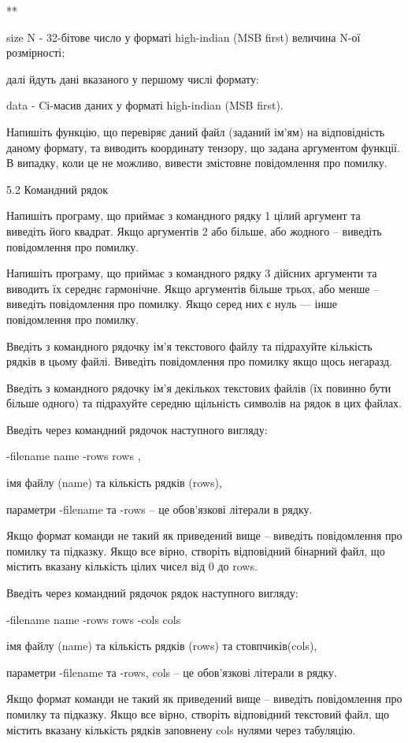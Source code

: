 \documentclass[]{article}
\begin{document}
**

size N - 32-бітове число у форматі high-indian (MSB first) величина N-ої
розмірності;

далі йдуть дані вказаного у першому числі формату:

data - Cі-масив даних у форматі high-indian (MSB first).

Напишіть функцію, що перевіряє даний файл (заданий ім'ям) на
відповідність даному формату, та виводить координату тензору, що задана
аргументом функції. В випадку, коли це не можливо, вивести змістовне
повідомлення про помилку.

5.2 Командний рядок

Напишіть програму, що приймає з командного рядку 1 цілий аргумент та
виведіть його квадрат. Якщо аргументів 2 або більше, або жодного --
виведіть повідомлення про помилку.

Напишіть програму, що приймає з командного рядку 3 дійсних аргументи та
виводить їх середнє гармонічне. Якщо аргументів більше трьох, або менше
-- виведіть повідомлення про помилку. Якщо серед них є нуль --- інше
повідомлення про помилку.

Введіть з командного рядочку ім'я текстового файлу та підрахуйте
кількість рядків в цьому файлі. Виведіть повідомлення про помилку якщо
щось негаразд.

Введіть з командного рядочку ім'я декількох текстових файлів (їх повинно
бути більше одного) та підрахуйте середню щільність символів на рядок в
цих файлах.

Введіть через командний рядочок наступного вигляду:

-filename name -rows rows ,

імя файлу (name) та кількість рядків (rows),

параметри -filename та -rows -- це обов'язкові літерали в рядку.

Якщо формат команди не такий як приведений вище -- виведіть повідомлення
про помилку та підказку. Якщо все вірно, створіть відповідний бінарний
файл, що містить вказану кількість цілих чисел від 0 до rows.

Введіть через командний рядочок рядок наступного вигляду:

-filename name -rows rows -cols cols

імя файлу (name) та кількість рядків (rows) та стовпчиків(cols),

параметри -filename та -rows, cols -- це обов'язкові літерали в рядку.

Якщо формат команди не такий як приведений вище -- виведіть повідомлення
про помилку та підказку. Якщо все вірно, створіть відповідний текстовий
файл, що містить вказану кількість рядків заповнену cols нулями через
табуляцію.
\end{document}
